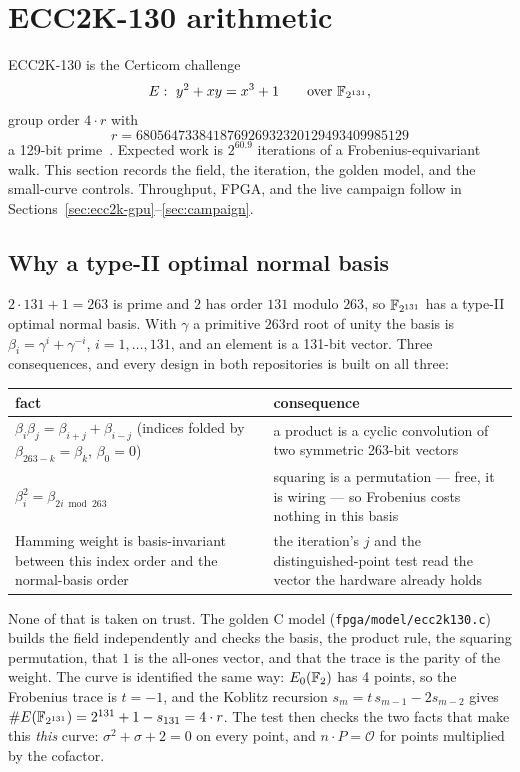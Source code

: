\section{ECC2K-130 arithmetic}
\label{sec:ecc2k-arith}

ECC2K-130 is the Certicom challenge
\[
  E:\ y^2 + xy = x^3 + 1 \qquad\text{over }\FF_{2^{131}},
\]
group order $4\cdot r$ with
\[
  r = 680564733841876926932320129493409985129
\]
a 129-bit prime~\cite{bailey2009,certicom1997}. Expected work is
$2^{60.9}$ iterations of a Frobenius-equivariant walk. This section
records the field, the iteration, the golden model, and the small-curve
controls. Throughput, FPGA, and the live campaign follow in
Sections~\ref{sec:ecc2k-gpu}--\ref{sec:campaign}.

\subsection{Why a type-II optimal normal basis}

$2\cdot 131+1=263$ is prime and $2$ has order $131$ modulo $263$, so
$\mathbb{F}_{2^{131}}$ has a type-II optimal normal basis. With $\gamma$ a
primitive $263$rd root of unity the basis is $\beta_i=\gamma^i+\gamma^{-i}$,
$i=1,\ldots,131$, and an element is a 131-bit vector. Three
consequences, and every design in both repositories is built on all
three:

\begin{center}
\small
\begin{tabular}{@{}p{}p{}@{}}
\toprule
fact & consequence \\
\midrule
$\beta_i\beta_j=\beta_{i+j}+\beta_{i-j}$
  (indices folded by $\beta_{263-k}=\beta_k$, $\beta_0=0$)
  & a product is a cyclic convolution of two symmetric 263-bit vectors \\
$\beta_i^2=\beta_{2i\bmod 263}$
  & squaring is a permutation --- free, it is wiring --- so Frobenius
    costs nothing in this basis \\
Hamming weight is basis-invariant between this index order and the
  normal-basis order
  & the iteration's $j$ and the distinguished-point test read the
    vector the hardware already holds \\
\bottomrule
\end{tabular}
\end{center}

None of that is taken on trust. The golden C model
(\texttt{fpga/model/ecc2k130.c}) builds the field independently and
checks the basis, the product rule, the squaring permutation, that
$1$ is the all-ones vector, and that the trace is the parity of the
weight. The curve is identified the same way: $E_0(\mathbb{F}_2)$ has 4
points, so the Frobenius trace is $t=-1$, and the Koblitz recursion
$s_m=t\,s_{m-1}-2s_{m-2}$ gives $\#E(\mathbb{F}_{2^{131}})=2^{131}+1-s_{131}
=4\cdot r$. The test then checks the two facts that make this
\emph{this} curve: $\sigma^2+\sigma+2=0$ on every point, and $n\cdot
P=\mathcal{O}$ for points multiplied by the cofactor.

